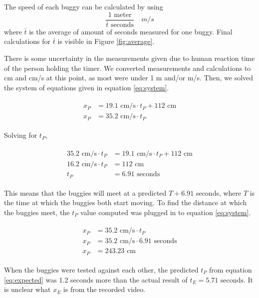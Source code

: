 \documentclass[12pt,twoside]{article}
\begin{document}
The speed of each buggy can be calculated by using
\begin{equation}
    \frac{\text{1 meter} }{\bar{t} \text{ seconds}} \quad m/s
\end{equation}
where $\bar{t}$ is the average of amount of seconds measured for one buggy.
Final calculations for $\bar{t}$ is visible in Figure \ref{fig:average}.

There is some uncertainty in the measurements given due to human reaction time
of the person holding the timer. We converted measurements and calculations to
cm and cm/s at this point, as most were under 1 m and/or m/s. Then, we solved
the system of equations given in equation \ref{eq:system}.

\begin{align}
    \begin{split}
        x_P &= 19.1 \text{ cm/s} \cdot t_P + 112 \text{ cm} \\
        x_P &= 35.2 \text{ cm/s} \cdot t_P
        \label{eq:system}
    \end{split}
\end{align}

Solving for $t_P$,

\begin{align}
    \begin{split}
        35.2 \text{ cm/s} \cdot t_P &= 19.1 \text{ cm/s} \cdot t_P + 112 \text{ cm} \\
        16.2 \text{ cm/s} \cdot t_P &= 112 \text{ cm} \\
        t_P &= 6.91 \text{ seconds}
    \end{split}
    \label{eq:expected}
\end{align}

This means that the buggies will meet at a predicted $T+6.91$ seconds, where $T$ is
the time at which the buggies both start moving. To find the distance at which
the buggies meet, the $t_P$ value computed was plugged in to equation \ref{eq:system}.

\begin{align}
    \begin{split}
        x_P &= 35.2 \text{ cm/s} \cdot t_P \\
        x_P &= 35.2 \text{ cm/s} \cdot 6.91 \text{ seconds} \\
        x_P &= 243.23 \text{ cm}
    \end{split}
\end{align}

When the buggies were tested against each other, the predicted $t_P$ from
equation \ref{eq:expected} was 1.2 seconds more than the actual result of $t_E =
5.71 \text{ seconds}$. It is unclear what $x_E$ is from the recorded video.
\end{document}

